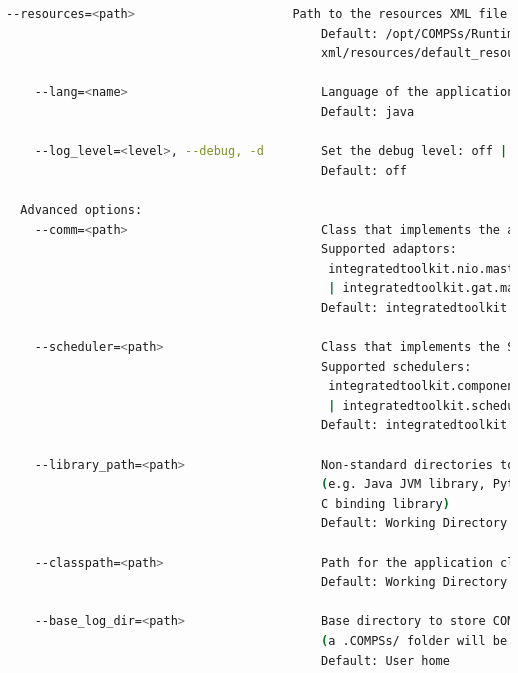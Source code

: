 \begin{lstlisting}[language=bash]
    --resources=<path>                      Path to the resources XML file
                                            Default: /opt/COMPSs/Runtime/configuration/
                                            xml/resources/default_resources.xml  
                                            
    --lang=<name>                           Language of the application (java/c/python)
                                            Default: java
                                            
    --log_level=<level>, --debug, -d        Set the debug level: off | info | debug
                                            Default: off

  Advanced options:
    --comm=<path>                           Class that implements the adaptor for communications
                                            Supported adaptors: 
                                             integratedtoolkit.nio.master.NIOAdaptor
                                             | integratedtoolkit.gat.master.GATAdaptor
                                            Default: integratedtoolkit.nio.master.NIOAdaptor
                                            
    --scheduler=<path>                      Class that implements the Scheduler for COMPSs
                                            Supported schedulers: 
                                             integratedtoolkit.components.impl.TaskScheduler 
                                             | integratedtoolkit.scheduler.readyscheduler.ReadyScheduler
                                            Default: integratedtoolkit.scheduler.readyscheduler.ReadyScheduler
                                            
    --library_path=<path>                   Non-standard directories to search for libraries 
                                            (e.g. Java JVM library, Python library, 
                                            C binding library)
                                            Default: Working Directory
                                            
    --classpath=<path>                      Path for the application classes / modules
                                            Default: Working Directory
                                            
    --base_log_dir=<path>                   Base directory to store COMPSs log files 
                                            (a .COMPSs/ folder will be created inside this location)
                                            Default: User home
                                            

\end{lstlisting}
